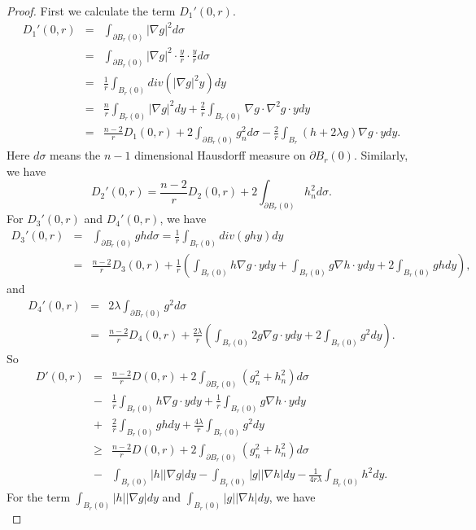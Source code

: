 \documentclass[a4paper, 12pt, onecolumn]{article} \textwidth 148mm
\begin{document}
\begin{proof}
First we calculate the term $D_1'(0,r)$.
\begin{eqnarray*}
D_1'(0,r)&=&\int_{\partial B_r(0)}|\nabla g|^2d\sigma
\\&=&\int_{\partial B_r(0)}|\nabla g|^2\cdot\frac{y}{r}\cdot\frac{y}{r}d\sigma
\\&=&\frac{1}{r}\int_{B_r(0)}div\left(|\nabla g|^2y\right)dy
\\&=&\frac{n}{r}\int_{B_r(0)}|\nabla g|^2dy+\frac{2}{r}\int_{B_r(0)}\nabla g\cdot\nabla^2g\cdot ydy
\\&=&\frac{n-2}{r}D_1(0,r)+2\int_{\partial B_r(0)}g_n^2d\sigma-\frac{2}{r}\int_{B_r}\left(h+2\lambda g\right)\nabla g\cdot ydy.
\end{eqnarray*}
Here $d\sigma$ means the $n-1$ dimensional Hausdorff measure on $\partial B_r(0)$.
Similarly, we have
\begin{equation*}
D_2'(0,r)=\frac{n-2}{r}D_2(0,r)+2\int_{\partial B_r(0)}h_n^2d\sigma.
\end{equation*}
For $D_3'(0,r)$ and $D_4'(0,r)$, we have
\begin{eqnarray*}
D_3'(0,r)&=&\int_{\partial B_r(0)}ghd\sigma=\frac{1}{r}\int_{B_r(0)}div(ghy)dy
\\&=&\frac{n-2}{r}D_3(0,r)+\frac{1}{r}\left(\int_{B_r(0)}h\nabla g\cdot ydy+\int_{B_r(0)}g\nabla h\cdot ydy+2\int_{B_r(0)}ghdy\right),
\end{eqnarray*}
and
\begin{eqnarray*}
D_4'(0,r)&=&2\lambda\int_{\partial B_r(0)}g^2d\sigma
\\&=&\frac{n-2}{r}D_4(0,r)+\frac{2\lambda}{r}\left(\int_{B_r(0)}2g\nabla g\cdot ydy+2\int_{B_r(0)}g^2dy\right).
\end{eqnarray*}
So
\begin{eqnarray*}
D'(0,r)&=&\frac{n-2}{r}D(0,r)+2\int_{\partial B_r(0)}\left(g_n^2+h_n^2\right)d\sigma
\\&-&\frac{1}{r}\int_{B_r(0)}h\nabla g\cdot ydy+\frac{1}{r}\int_{B_r(0)}g\nabla h\cdot ydy
\\&+&\frac{2}{r}\int_{B_r(0)}ghdy+\frac{4\lambda}{r}\int_{B_r(0)}g^2dy
\\&\geq&\frac{n-2}{r}D(0,r)+2\int_{\partial B_r(0)}\left(g_n^2+h_n^2\right)d\sigma
\\&-&\int_{B_r(0)}|h||\nabla g|dy-\int_{B_r(0)}|g||\nabla h|dy-\frac{1}{4r\lambda}\int_{B_r(0)}h^2dy.
\end{eqnarray*}
For the term $\int_{B_r(0)}|h||\nabla g|dy$ and $\int_{B_r(0)}|g||\nabla h|dy$, we have
\begin{equation*}

\end{equation*}
\end{proof}
\end{document}
